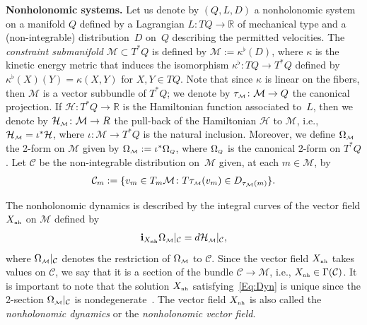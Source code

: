 \documentclass[pdftex]{sigma}
\numberwithin{equation}{section}
\def\M{\mathcal{M}}
\def\C{\mathcal{C}}
\def\Ham{\mathcal{H}}
\def\R{\mathbb{R}}
\def\nh{{\mbox{\tiny{nh}}}}
\def\subM{{\mbox{\tiny{$\M$}}}}
\def\subQQ{{\mbox{\tiny{$Q$}}}}
\begin{document}
{\bf Nonholonomic systems.} Let us denote by $(Q, L, D)$
a nonholonomic system on a manifold $Q$ def\/ined by a Lagrangian
$L\colon TQ\to \R$ of mechanical type and a (non-integrable) distribution~$D$ on~$Q$ describing the permitted velocities.
The {\it constraint submanifold} $\M\subset T^*Q$ is def\/ined by
$\M:=\kappa^\flat(D)$, where $\kappa$ is the kinetic energy metric
that induces the isomorphism $\kappa^\flat\colon TQ\to T^*Q$
def\/ined by $\kappa^\flat(X)(Y)= \kappa(X,Y)$ for $X,Y \in TQ$.
Note that since $\kappa$ is linear on the f\/ibers, then $\M$ is a vector subbundle of
$T^*Q$; we denote by $\tau_\subM\colon \M \to Q$ the canonical projection.
If $\Ham\colon T^*Q\to \R$ is the Hamiltonian function associated to~$L$,  then we denote
by $\Ham_\subM \colon \M \to R$ the pull-back of
the Hamiltonian $\Ham$ to $\M$, i.e., $\Ham_\subM = \iota^*\Ham$,
where $\iota \colon \M \to T^*Q$ is the natural inclusion.
Moreover, we def\/ine $\Omega_\subM$ the 2-form on $\M$ given by
$\Omega_\subM := \iota^*\Omega_\subQQ$, where $\Omega_\subQQ$ is the
canonical 2-form on $T^*Q$.
Let $\C$ be the non-integrable distribution on~$\M$ given, at each $m\in \M$, by
\begin{gather*}%
\C_m :=\{ v_m \in T_m\M \colon T\tau_\subM(v_m) \in D_{\tau_\M(m)} \}.
\end{gather*}

The nonholonomic dynamics is described by the integral curves of the vector
f\/ield $X_\nh$ on $\M$ def\/ined by
\begin{gather}\label{Eq:Dyn}
{\bf i}_{X_\nh} \Omega_\subM |_\C = d\Ham_\subM |_\C  ,
\end{gather}
where $\Omega_\subM|_\C$ denotes the restriction of $\Omega_\subM$ to $\C$.
Since the vector f\/ield $X_\nh$ takes
values on $\C$, we say that it is  a section of the bundle $\C\to\M$, i.e.,
$X_\nh\in \Gamma(\C)$.  It is important to note that the solution
$X_\nh$ satisfying~\eqref{Eq:Dyn} is unique since the 2-section $\Omega_\subM |_\C$
is nondegenerate~\cite{BS93}. The vector f\/ield $X_\nh$ is also called the {\it nonholonomic dynamics}
or the {\it nonholonomic vector field}.
\end{document}
